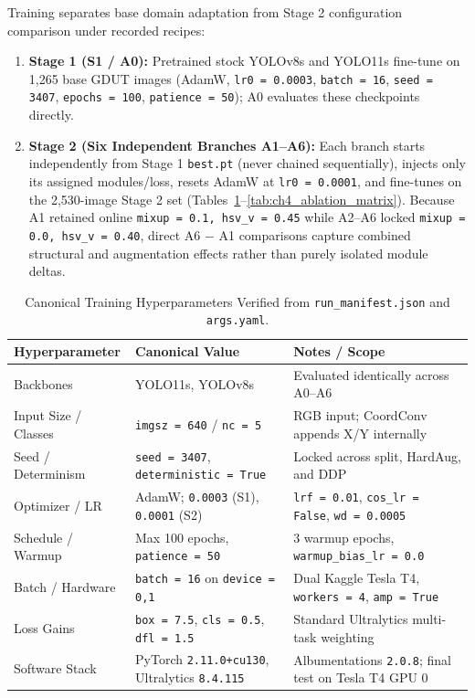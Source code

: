 Training separates base domain adaptation from Stage 2 configuration comparison under recorded recipes:
\begin{enumerate}[leftmargin=1.8em, itemsep=2pt]
  \item \textbf{Stage 1 (S1 / A0):} Pretrained stock YOLOv8s and YOLO11s fine-tune on 1,265 base GDUT images (AdamW, \texttt{lr0 = 0.0003}, \texttt{batch = 16}, \texttt{seed = 3407}, \texttt{epochs = 100}, \texttt{patience = 50}); A0 evaluates these checkpoints directly.
  \item \textbf{Stage 2 (Six Independent Branches A1--A6):} Each branch starts independently from Stage 1 \texttt{best.pt} (never chained sequentially), injects only its assigned modules/loss, resets AdamW at \texttt{lr0 = 0.0001}, and fine-tunes on the 2,530-image Stage 2 set (Tables~\ref{tab:ch4_hyperparams}--\ref{tab:ch4_ablation_matrix}). Because A1 retained online \texttt{mixup = 0.1, hsv\_v = 0.45} while A2--A6 locked \texttt{mixup = 0.0, hsv\_v = 0.40}, direct A6 $-$ A1 comparisons capture combined structural and augmentation effects rather than purely isolated module deltas.
\end{enumerate}

\begin{table}[htbp]
\centering
\caption{Canonical Training Hyperparameters Verified from \nolinkurl{run_manifest.json} and \texttt{args.yaml}.}
\label{tab:ch4_hyperparams}
\footnotesize
\renewcommand{\arraystretch}{1.12}
\begin{tabularx}{\textwidth}{|p{4.0cm}|p{4.2cm}|X|}
\hline
\rowcolor{slatehdr}
\textbf{Hyperparameter} & \textbf{Canonical Value} & \textbf{Notes / Scope} \\
\hline
Backbones & YOLO11s, YOLOv8s & Evaluated identically across A0--A6 \\ \hline
Input Size / Classes & \texttt{imgsz = 640} / \texttt{nc = 5} & RGB input; CoordConv appends X/Y internally \\ \hline
Seed / Determinism & \texttt{seed = 3407}, \nolinkurl{deterministic = True} & Locked across split, HardAug, and DDP \\ \hline
Optimizer / LR & AdamW; \texttt{0.0003} (S1), \texttt{0.0001} (S2) & \texttt{lrf = 0.01}, \texttt{cos\_lr = False}, \texttt{wd = 0.0005} \\ \hline
Schedule / Warmup & Max 100 epochs, \texttt{patience = 50} & 3 warmup epochs, \nolinkurl{warmup_bias_lr = 0.0} \\ \hline
Batch / Hardware & \texttt{batch = 16} on \texttt{device = 0,1} & Dual Kaggle Tesla T4, \texttt{workers = 4}, \texttt{amp = True} \\ \hline
Loss Gains & \texttt{box = 7.5}, \texttt{cls = 0.5}, \texttt{dfl = 1.5} & Standard Ultralytics multi-task weighting \\ \hline
Software Stack & PyTorch \texttt{2.11.0+cu130}, Ultralytics \texttt{8.4.115} & Albumentations \texttt{2.0.8}; final test on Tesla T4 GPU 0 \\ \hline
\end{tabularx}
\end{table}

